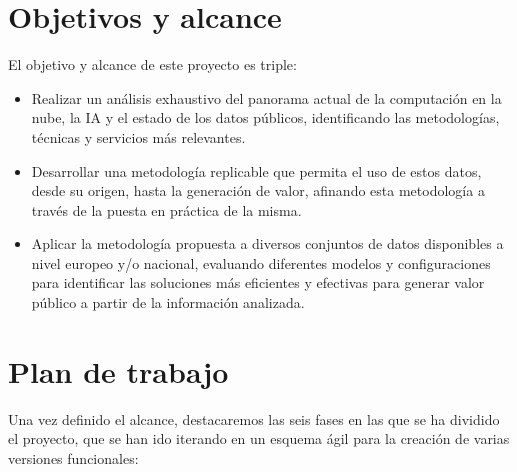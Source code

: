 \section{Objetivos y alcance}

El objetivo y alcance de este proyecto es triple:
\begin{itemize}
	\item Realizar un análisis exhaustivo del panorama actual de la computación en la nube, la IA y el estado de los datos públicos, identificando las metodologías, técnicas y servicios más relevantes.
	
	\item Desarrollar una metodología replicable que permita el uso de estos datos, desde su origen, hasta la generación de valor, afinando esta metodología a través de la puesta en práctica de la misma.
	
	\item Aplicar la metodología propuesta a diversos conjuntos de datos disponibles a nivel europeo y/o nacional, evaluando diferentes modelos y configuraciones para identificar las soluciones más eficientes y efectivas para generar valor público a partir de la información analizada.
	
\end{itemize}


\section{Plan de trabajo}

Una vez definido el alcance, destacaremos las seis fases en las que se ha dividido el proyecto, que se han ido iterando en un esquema ágil para la creación de varias versiones funcionales:

